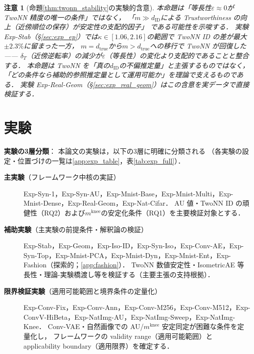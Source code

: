 \documentclass[11pt,a4paper]{jsarticle}
\newtheorem{remark}{注意}
\newcommand{\kap}{\kappa}
\newcommand{\mknee}{m^{\mathrm{knee}}}
\begin{document}
\begin{remark}[命題\ref{thm:twonn_stability}の実験的含意]
本命題は「等長性$\varepsilon \approx 0$が TwoNN 精度の唯一の条件」ではなく，
「$m \gg d_\mathrm{ID}$による Trustworthiness の向上（近傍順位の保存）が安定性の支配的因子」
である可能性を示唆する．
実験 Exp-Stab（§\ref{sec:exp_ep}）では$\kap \in [1.06, 2.16]$の範囲で TwoNN ID の差が最大$\pm 2.3\%$に留まった一方，
$m = d_\mathrm{true}$から$m > d_\mathrm{true}$への移行で TwoNN が回復した——
$\delta_T$（近傍逆転率）の減少が$\varepsilon$（等長性）の変化より支配的であることと整合する．
本命題は TwoNN を「真の$d_\mathrm{ID}$の不偏推定量」と主張するものではなく，
「どの条件なら補助的参照推定量として運用可能か」を理論で支えるものである．
実験 Exp-Real-Geom（§\ref{sec:exp_real_geom}）はこの含意を実データで直接検証する．
\end{remark}

\section{実験}\label{sec:exp}

\textbf{実験の3層分類}：
本論文の実験は，以下の3層に明確に分類される
（各実験の設定・位置づけの一覧は\ref{app:exp_table}，表\ref{tab:exp_full}）．
\begin{description}
  \item[\textbf{主実験}（フレームワーク中核の実証）]
        Exp-Syn-1，Exp-Syn-AU，Exp-Mnist-Base，Exp-Mnist-Multi，Exp-Mnist-Dense，Exp-Real-Geom，Exp-Nat-Cifar．
        AU 値・TwoNN ID の頑健性（RQ2）および$\mknee$の安定化条件（RQ1）を主要検証対象とする．
  \item[\textbf{補助実験}（主実験の前提条件・解釈論の検証）]
        Exp-Stab，Exp-Geom，Exp-Iso-ID，Exp-Syn-Iso，Exp-Conv-AE，Exp-Syn-Top，Exp-Mnist-PCA，Exp-Mnist-Dyn，Exp-Mnist-Ent，Exp-Fashion（探索的；\ref{app:fashion}）．
        TwoNN 数値安定性・IsometricAE 等長性・理論-実験橋渡し等を検証する（主要主張の支持根拠）．
  \item[\textbf{限界検証実験}（適用可能範囲と境界条件の定量化）]
        Exp-Conv-Fix，Exp-Conv-Ann，Exp-Conv-M256，Exp-Conv-M512，Exp-ConvV-HiBeta，Exp-NatImg-AU，Exp-NatImg-Sweep，Exp-NatImg-Knee．
        Conv-VAE・自然画像での AU/$\mknee$ 安定同定が困難な条件を定量化し，
        フレームワークの validity range（適用可能範囲）と applicability boundary（適用限界）を確定する．
\end{description}
\end{document}
